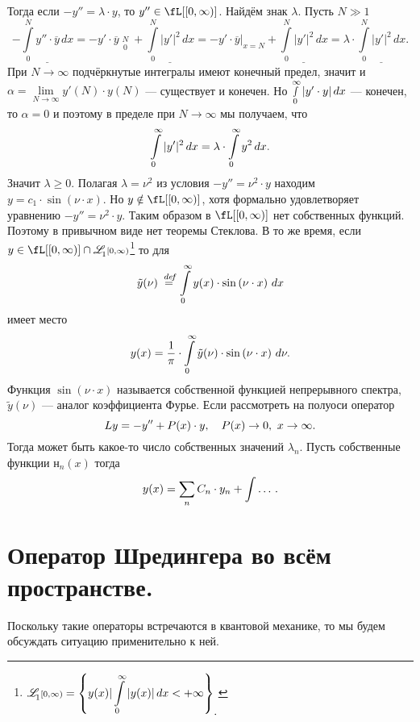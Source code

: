 Тогда если $-y''=\lambda\cdot y$, то $y''\in\fL[{[0,\infty)}]$. Найдём знак $\lambda$. Пусть $N\gg1$
\begin{equation*}
	-\underline{\int\limits_0^N y''\cdot\overline{y}\,dx}=-y'\cdot\overline{y}\mathop{\Big|}\limits_{0}^{N}+\underline{\int\limits_0^N|y'|^2\,dx}=-y'\cdot\overline{y}\Big|_{x=N}+\underline{\int\limits_0^N|y'|^2\,dx}=\lambda\cdot\underline{\int\limits_0^N|y'|^2\,dx}.
\end{equation*}    
При $N\to\infty$ подчёркнутые интегралы имеют конечный предел, значит и $\alpha=\lim\limits_{N\to\infty}y'(N)\cdot y(N)$ --- существует и конечен. Но $\smallint\limits_0^{\infty}|y'\cdot y|\,dx$ --- конечен, то $\alpha=0$ и поэтому в пределе при $N\to\infty$ мы получаем, что
\begin{equation*}
	\hfill\int\limits_0^{\infty}|y'|^2\,dx=\lambda\cdot\int\limits_0^{\infty}y^2\,dx.\hfill
\end{equation*}
Значит $\lambda\geqslant0$. Полагая $\lambda=\nu^2$ из условия $-y''=\nu^2\cdot y$ находим $y=c_1\cdot\sin\left(\nu\cdot x\right)$. Но $y\notin\fL[{[0,\infty)}]$, хотя формально удовлетворяет уравнению $-y''=\nu^2\cdot y$. Таким образом в $\fL[{[0,\infty)}]$ нет собственных функций. Поэтому в привычном виде нет теоремы Стеклова. В то же время, если $y\in\fL[{[0,\infty)}]\cap\fLone[{[0,\infty)}]$\footnote{$\displaystyle\fLone[{[0,\infty)}]=\left\{y(x)|\int\limits_{0}^{\infty}|y(x)|\,dx<+\infty\right\}_{\displaystyle.}$} то для 
\begin{equation*}
	\hfill \tilde{y}(\nu)\eqdef\int\limits_0^{\infty}y(x)\cdot\sin\left(\nu\cdot x\right)\,dx\hfill
\end{equation*}
имеет место 
\begin{equation*}
	\hfill y(x)=\frac{1}{\pi}\cdot\int\limits_0^{\infty}\tilde{y}(\nu)\cdot\sin\left(\nu\cdot x\right)\,d\nu.\hfill
\end{equation*}
Функция $\sin\left(\nu\cdot x\right)$ называется собственной функцией непрерывного спектра, $\tilde{y}(\nu)$ --- аналог коэффициента Фурье. Если рассмотреть на полуоси оператор 
\begin{equation*}
	\hfill Ly=-y''+P(x)\cdot y,\quad P(x)\to0,\ x\to\infty.\hfill
\end{equation*}
Тогда может быть какое-то число собственных значений $\lambda_n$. Пусть собственные функции $н_n(x)$ тогда
\begin{equation*}
	\hfill y(x)=\sum\limits_{n}C_n\cdot y_n+\int\dots\,.\hfill
\end{equation*}
\section{Оператор Шредингера во всём пространстве.}
\label{lecture10section3}
Поскольку такие операторы встречаются в квантовой механике, то мы будем обсуждать ситуацию применительно к ней.
